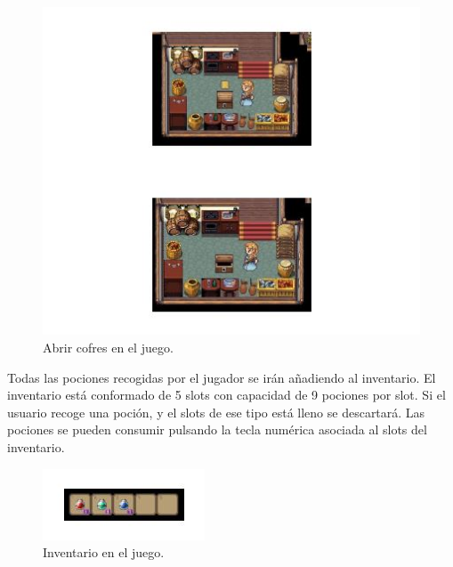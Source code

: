 \begin{figure}[!htb]
  \centering
    \includegraphics{./img/2.JPG}
    \caption{Abrir cofres en el juego.}
  \label{fig:yo}
\end{figure}
Todas las pociones recogidas por el jugador se irán añadiendo al inventario. El inventario está conformado de 5 slots con capacidad de 9 pociones por slot. Si el usuario recoge una poción, y el slots de ese tipo está lleno se descartará. Las pociones se pueden consumir pulsando la tecla numérica asociada al slots del inventario.
\begin{figure}[!htb]
  \centering
    \includegraphics{./img/3.JPG}
    \caption{Inventario en el juego.}
  \label{fig:yo}
\end{figure}
